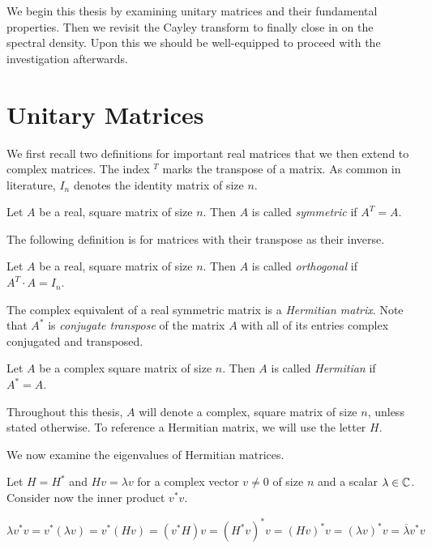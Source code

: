 We begin this thesis by examining unitary matrices and their fundamental properties.
Then we revisit the Cayley transform to finally close in on the spectral density.
Upon this we should be well-equipped to proceed with the investigation afterwards.

\section{Unitary Matrices}

We first recall two definitions for important real matrices that we then extend to complex matrices.
The index $^T$ marks the transpose of a matrix.
As common in literature, $I_n$ denotes the identity matrix of size $n$.

\begin{definition}
    Let $A$ be a real, square matrix of size $n$.
    Then $A$ is called \emph{symmetric} if $A^T = A$.
\end{definition}

The following definition is for matrices with their transpose as their inverse.

\begin{definition}
    Let $A$ be a real, square matrix of size $n$.
    Then $A$ is called \emph{orthogonal} if $A^T \cdot A = I_n$.
\end{definition}

The complex equivalent of a real symmetric matrix is a \emph{Hermitian matrix}.
Note that $A^*$ is \emph{conjugate transpose} of the matrix $A$ with all of its entries complex conjugated and transposed.

\begin{definition}
    Let $A$ be a complex square matrix of size $n$.
    Then $A$ is called \emph{Hermitian} if $A^* = A$.
\end{definition}

Throughout this thesis, $A$ will denote a complex, square matrix of size $n$,
unless stated otherwise.
To reference a Hermitian matrix, we will use the letter $H$.

We now examine the eigenvalues of Hermitian matrices.

Let $H = H^*$ and $H v = \lambda v$ for a complex vector $v \neq 0$ of size $n$ and a scalar $\lambda \in \mathbb{C}$.
Consider now the inner product $ v^* v$.

\begin{equation} \label{eq:real_symmetric_inner_product}
    \lambda v^* v = v^* \left( \lambda v \right)
    = v^* \left( H v \right)
    = \left(v^* H \right) v
    = \left( H^* v \right)^* v
    = \left( H v \right)^* v
    = (\lambda v)^* v
    = \overline{\lambda} v^* v
\end{equation}


